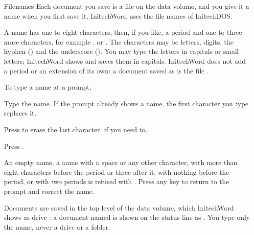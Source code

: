 \begin{Feature}{Filenames}
Each document you save is a file on the data volume, and you give it a
name when you first save it.  InitechWord uses the file names of
InitechDOS.

A name has one to eight characters, then, if you like, a period and one to
three more characters, for example ,  or
.  The characters may be letters, digits, the hyphen
(\Scr{-}) and the underscore (\Scr{\_}).  You may type the letters in
capitals or small letters; InitechWord shows and saves them in capitals.
InitechWord does not add a period or an extension of its own: a document
saved as  is the file .

To type a name at a prompt,
\begin{WPSteps}
\item Type the name.  If the prompt already shows a name, the first
character you type replaces it.
\item Press  to erase the last character, if you need to.
\item Press .
\end{WPSteps}

\Notes
{}
An empty name, a name with a space or any other character, with more than eight
characters before the period or three after it, with nothing before the
period, or with two periods is refused with .  Press any key to
return to the prompt and correct the name.

Documents are saved in the top level of the data volume, which InitechWord
shows as drive : a document named  is shown on the
status line as .  You type only the name, never a drive or
a folder.

\end{Feature}

